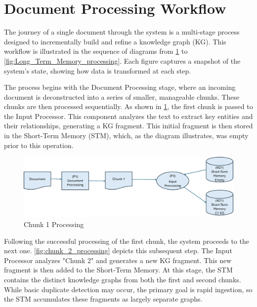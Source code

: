 \section{Document Processing Workflow}
The journey of a single document through the system is a multi-stage process designed to incrementally build and refine a knowledge graph (KG). This workflow is illustrated in the sequence of diagrams from \cref{fig:chunk_1_processing} to \cref{fig:Long_Term_Memory_processing}. Each figure captures a snapshot of the system's state, showing how data is transformed at each step.

The process begins with the Document Processing stage, where an incoming document is deconstructed into a series of smaller, manageable chunks. These chunks are then processed sequentially. As shown in \cref{fig:chunk_1_processing}, the first chunk is passed to the Input Processor. This component analyzes the text to extract key entities and their relationships, generating a KG fragment. This initial fragment is then stored in the Short-Term Memory (STM), which, as the diagram illustrates, was empty prior to this operation.

\begin{figure}[htp]
    \centering
    \includegraphics[width=\linewidth]{figures/chap3_fig/Chunk 1 Processing.png}
    \caption{Chunk 1 Processing}
    \label{fig:chunk_1_processing}
\end{figure}

Following the successful processing of the first chunk, the system proceeds to the next one. \cref{fig:chunk_2_processing} depicts this subsequent step. The Input Processor analyzes "Chunk 2" and generates a new KG fragment. This new fragment is then added to the Short-Term Memory. At this stage, the STM contains the distinct knowledge graphs from both the first and second chunks. While basic duplicate detection may occur, the primary goal is rapid ingestion, so the STM accumulates these fragments as largely separate graphs.

